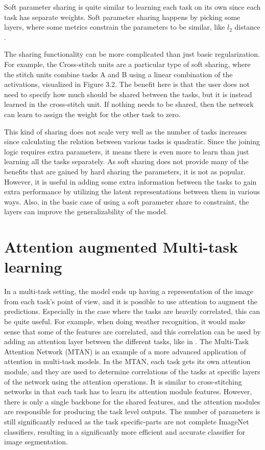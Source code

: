 Soft parameter sharing is quite similar to learning each task on its own since each task has separate weights. 
Soft parameter sharing happens by picking some layers, where some metrics constrain the parameters to be similar, like ${l_2}$ distance \citep{ruderOverview}. 

The sharing functionality can be more complicated than just basic regularization. 
For example, the Cross-stitch units \citep{crossStitch} are a particular type of soft sharing, where the stitch units combine tasks A and B using a linear combination of the activations, visualized in Figure 3.2. 
The benefit here is that the user does not need to specify how much should be shared between the tasks, but it is instead learned in the cross-stitch unit. 
If nothing needs to be shared, then the network can learn to assign the weight for the other task to zero.

This kind of sharing does not scale very well as the number of tasks increases since calculating the relation between various tasks is quadratic. 
Since the joining logic requires extra parameters, it means there is even more to learn than just learning all the tasks separately. 
As soft sharing does not provide many of the benefits that are gained by hard sharing the parameters, it is not as popular.
However, it is useful in adding some extra information between the tasks to gain extra performance by utilizing the latent representations between them in various ways.
Also, in the basic case of using a soft parameter share to constraint, the layers can improve the generalizability of the model.

\section{Attention augmented Multi-task learning}
In a multi-task setting, the model ends up having a representation of the image from each task's point of view, and it is possible to use attention \citep{attention} to augment the predictions.
Especially in the case where the tasks are heavily correlated, this can be quite useful.
For example, when doing weather recognition, it would make sense that some of the features are correlated, and this correlation can be used by adding an attention layer between the different tasks, like in \citep{cnn-rnn}.
The Multi-Task Attention Network (MTAN) \citep{multiTaskAttention} is an example of a more advanced application of attention in multi-task models.
In the MTAN, each task gets its own attention module, and they are used to determine correlations of the tasks at specific layers of the network using the attention operations.
It is similar to cross-stitching networks in that each task has to learn its attention module features. 
However, there is only a single backbone for the shared features, and the attention modules are responsible for producing the task level outputs.
The number of parameters is still significantly reduced as the task specific-parts are not complete ImageNet classifiers, resulting in a significantly more efficient and accurate classifier for image segmentation.

